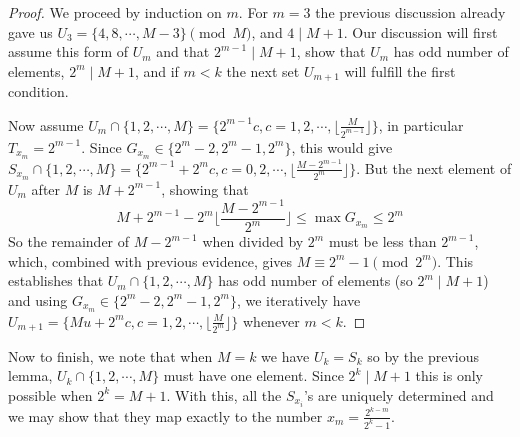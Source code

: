 \documentclass[11pt,a4paper]{article}
\begin{document}
\begin{enumerate}
	    \begin{proof}
	    	We proceed by induction on $m$. 
	    	For $m = 3$ the previous discussion already gave us $U_3 = \{4, 8, \cdots, M - 3\}\pmod{M}$, 
	    	and $4 \mid M + 1$. 
	    	Our discussion will first assume this form of $U_m$ and that $2^{m-1}\mid M + 1$, show that $U_m$ has odd number of elements, $2^m\mid M + 1$, 
	    	and if $m < k$ the next set $U_{m+1}$ will fulfill the first condition. 
	    	
	    	Now assume $U_m \cap \{1, 2, \cdots, M\} = \{2^{m-1}c, c = 1, 2, \cdots, \lfloor \frac{M}{2^{m-1}}\rfloor\}$, 
	    	in particular $T_{x_m} = 2^{m-1}$. 
	    	Since $G_{x_m}\in \{2^m - 2, 2^m - 1, 2^m\}$, this would give 
	    	$S_{x_m} \cap \{1, 2, \cdots, M\} = \{2^{m-1} + 2^{m}c, c = 0, 2, \cdots, \lfloor \frac{M - 2^{m-1}}{2^{m}}\rfloor\}$. 
	    	But the next element of $U_m$ after $M$ is $M + 2^{m-1}$, showing that 
	    	\[
	    	M + 2^{m-1} - 2^m \lfloor \frac{M - 2^{m-1}}{2^{m}}\rfloor\le \max G_{x_m}\le 2^m
	    	\]
	    	So the remainder of $M - 2^{m-1}$ when divided by $2^m$ must be less than $2^{m-1}$, 
	    	which, combined with previous evidence, gives $M\equiv 2^m-1\pmod{2^m}$. 
	    	This establishes that $U_m\cap \{1, 2, \cdots, M\}$ has odd number of elements (so $2^m \mid M + 1$) 
	    	and using $G_{x_m}\in \{2^m - 2, 2^m - 1, 2^m\}$, we iteratively have 
	    	$U_{m+1} = \{Mu + 2^{m}c, c = 1, 2, \cdots, \lfloor \frac{M}{2^{m}}\rfloor\}$ whenever $m < k$. 
	    \end{proof}
        Now to finish, we note that when $M = k$ we have $U_k = S_k$ so by the previous lemma, $U_k\cap \{1, 2, \cdots, M\}$ must have one element. 
        Since $2^k\mid M+1$ this is only possible when $2^k = M + 1$. 
        With this, all the $S_{x_i}$'s are uniquely determined and we may show that they map exactly to the number $x_m = \frac{2^{k-m}}{2^k-1}$. 
		
	\end{enumerate}
    
\end{document}
